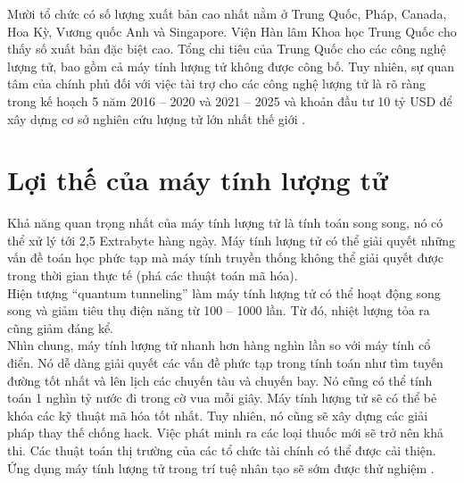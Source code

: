 \indent Mười tổ chức có số lượng xuất bản cao nhất nằm ở Trung Quốc, Pháp, Canada, Hoa Kỳ, Vương quốc Anh và Singapore. Viện Hàn lâm Khoa học Trung Quốc cho thấy số xuất bản đặc biệt cao. Tổng chi tiêu của Trung Quốc cho các công nghệ lượng tử, bao gồm cả máy tính lượng tử không được công bố. Tuy nhiên, sự quan tâm của chính phủ đối với việc tài trợ cho các công nghệ lượng tử là rõ ràng trong kế hoạch 5 năm 2016 – 2020 \cite{Quantique2018quantum} và 2021 – 2025 \cite{cuckhoahoc2021quantum} và khoản đầu tư 10 tỷ USD để xây dựng cơ sở nghiên cứu lượng tử lớn nhất thế giới \cite{jeffrey2017quantum}.

\section{Lợi thế của máy tính lượng tử}
\indent Khả năng quan trọng nhất của máy tính lượng tử là tính toán song song, nó có thể xử lý tới 2,5 Extrabyte hàng ngày. Máy tính lượng tử có thể giải quyết những vấn đề toán học phức tạp mà máy tính truyền thống không thể giải quyết được trong thời gian thực tế (phá các thuật toán mã hóa).\\
\indent Hiện tượng “quantum tunneling” làm máy tính lượng tử có thể hoạt động song song và giảm tiêu thụ điện năng từ 100 – 1000 lần. Từ đó, nhiệt lượng tỏa ra cũng giảm đáng kể.\\
\indent Nhìn chung, máy tính lượng tử nhanh hơn hàng nghìn lần so với máy tính cổ điển. Nó dễ dàng giải quyết các vấn đề phức tạp trong tính toán như tìm tuyến đường tốt nhất và lên lịch các chuyến tàu và chuyến bay. Nó cũng có thể tính toán 1 nghìn tỷ nước đi trong cờ vua mỗi giây. Máy tính lượng tử sẽ có thể bẻ khóa các kỹ thuật mã hóa tốt nhất. Tuy nhiên, nó cũng sẽ xây dựng các giải pháp thay thế chống hack. Việc phát minh ra các loại thuốc mới sẽ trở nên khả thi. Các thuật toán thị trường của các tổ chức tài chính có thể được cải thiện. Ứng dụng máy tính lượng tử trong trí tuệ nhân tạo sẽ sớm được thử nghiệm \cite{marella2020introduction}.


